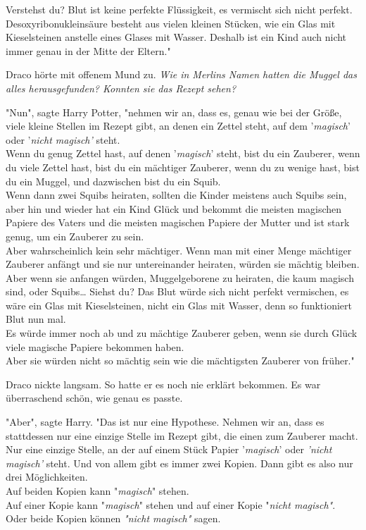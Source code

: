 {Verstehst du? Blut ist keine perfekte Flüssigkeit, es vermischt sich nicht perfekt. Desoxyribonukleinsäure besteht aus vielen kleinen Stücken, wie ein Glas mit Kieselsteinen anstelle eines Glases mit Wasser. Deshalb ist ein Kind auch nicht immer genau in der Mitte der Eltern."

Draco hörte mit offenem Mund zu. \emph{Wie in Merlins Namen hatten die Muggel das alles herausgefunden? Konnten sie das Rezept sehen?}

"Nun", sagte Harry Potter, "nehmen wir an, dass es, genau wie bei der Größe, viele kleine Stellen im Rezept gibt, an denen ein Zettel steht, auf dem '\emph{magisch}' oder '\emph{nicht magisch'} steht.\\ Wenn du genug Zettel hast, auf denen '\emph{magisch}' steht, bist du ein Zauberer, wenn du viele Zettel hast, bist du ein mächtiger Zauberer, wenn du zu wenige hast, bist du ein Muggel, und dazwischen bist du ein Squib.\\ Wenn dann zwei Squibs heiraten, sollten die Kinder meistens auch Squibs sein, aber hin und wieder hat ein Kind Glück und bekommt die meisten magischen Papiere des Vaters und die meisten magischen Papiere der Mutter und ist stark genug, um ein Zauberer zu sein.\\ Aber wahrscheinlich kein sehr mächtiger. Wenn man mit einer Menge mächtiger Zauberer anfängt und sie nur untereinander heiraten, würden sie mächtig bleiben.\\ Aber wenn sie anfangen würden, Muggelgeborene zu heiraten, die kaum magisch sind, oder Squibs… Siehst du? Das Blut würde sich nicht perfekt vermischen, es wäre ein Glas mit Kieselsteinen, nicht ein Glas mit Wasser, denn so funktioniert Blut nun mal.\\ Es würde immer noch ab und zu mächtige Zauberer geben, wenn sie durch Glück viele magische Papiere bekommen haben.\\ Aber sie würden nicht so mächtig sein wie die mächtigsten Zauberer von früher."

Draco nickte langsam. So hatte er es noch nie erklärt bekommen. Es war überraschend schön, wie genau es passte.

"Aber", sagte Harry. "Das ist nur eine Hypothese. Nehmen wir an, dass es stattdessen nur eine einzige Stelle im Rezept gibt, die einen zum Zauberer macht.\\ Nur eine einzige Stelle, an der auf einem Stück Papier '\emph{magisch}' oder \emph{'nicht magisch'} steht. Und von allem gibt es immer zwei Kopien. Dann gibt es also nur drei Möglichkeiten.\\ Auf beiden Kopien kann "\emph{magisch}" stehen.\\ Auf einer Kopie kann "\emph{magisch}" stehen und auf einer Kopie "\emph{nicht magisch"}.\\ Oder beide Kopien können \emph{"nicht magisch"} sagen.

}
